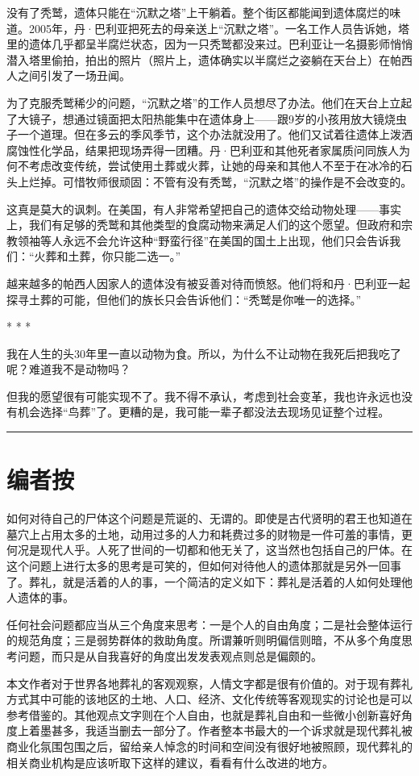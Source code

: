 \documentclass[12pt,oneside]{book}
\newcommand\hr{\par\noindent\hrule}
\begin{document}
没有了秃鹫，遗体只能在“沉默之塔”上干躺着。整个街区都能闻到遗体腐烂的味道。2005年，丹·巴利亚把死去的母亲送上“沉默之塔”。一名工作人员告诉她，塔里的遗体几乎都呈半腐烂状态，因为一只秃鹫都没来过。巴利亚让一名摄影师悄悄潜入塔里偷拍，拍出的照片（照片上，遗体确实以半腐烂之姿躺在天台上）在帕西人之间引发了一场丑闻。

为了克服秃鹫稀少的问题，“沉默之塔”的工作人员想尽了办法。他们在天台上立起了大镜子，想通过镜面把太阳热能集中在遗体身上——跟9岁的小孩用放大镜烧虫子一个道理。但在多云的季风季节，这个办法就没用了。他们又试着往遗体上泼洒腐蚀性化学品，结果把现场弄得一团糟。丹·巴利亚和其他死者家属质问同族人为何不考虑改变传统，尝试使用土葬或火葬，让她的母亲和其他人不至于在冰冷的石头上烂掉。可惜牧师很顽固：不管有没有秃鹫，“沉默之塔”的操作是不会改变的。

这真是莫大的讽刺。在美国，有人非常希望把自己的遗体交给动物处理——事实上，我们有足够的秃鹫和其他类型的食腐动物来满足人们的这个愿望。但政府和宗教领袖等人永远不会允许这种“野蛮行径”在美国的国土上出现，他们只会告诉我们：“火葬和土葬，你只能二选一。”

越来越多的帕西人因家人的遗体没有被妥善对待而愤怒。他们将和丹·巴利亚一起探寻土葬的可能，但他们的族长只会告诉他们：“秃鹫是你唯一的选择。”

\begin{center}
* * *
\end{center}
我在人生的头30年里一直以动物为食。所以，为什么不让动物在我死后把我吃了呢？难道我不是动物吗？

但我的愿望很有可能实现不了。我不得不承认，考虑到社会变革，我也许永远也没有机会选择“鸟葬”了。更糟的是，我可能一辈子都没法去现场见证整个过程。

\hr


\section{编者按}
如何对待自己的尸体这个问题是荒诞的、无谓的。即使是古代贤明的君王也知道在墓穴上占用太多的土地，动用过多的人力和耗费过多的财物是一件可羞的事情，更何况是现代人乎。人死了世间的一切都和他无关了，这当然也包括自己的尸体。在这个问题上进行太多的思考是可笑的，但如何对待他人的遗体那就是另外一回事了。葬礼，就是活着的人的事，一个简洁的定义如下：葬礼是活着的人如何处理他人遗体的事。

任何社会问题都应当从三个角度来思考：一是个人的自由角度；二是社会整体运行的规范角度；三是弱势群体的救助角度。所谓兼听则明偏信则暗，不从多个角度思考问题，而只是从自我喜好的角度出发发表观点则总是偏颇的。

本文作者对于世界各地葬礼的客观观察，人情文字都是很有价值的。对于现有葬礼方式其中可能的该地区的土地、人口、经济、文化传统等客观现实的讨论也是可以参考借鉴的。其他观点文字则在个人自由，也就是葬礼自由和一些微小创新喜好角度上着墨甚多，我适当删去一部分了。作者整本书最大的一个诉求就是现代葬礼被商业化氛围包围之后，留给亲人悼念的时间和空间没有很好地被照顾，现代葬礼的相关商业机构是应该听取下这样的建议，看看有什么改进的地方。
\end{document}
